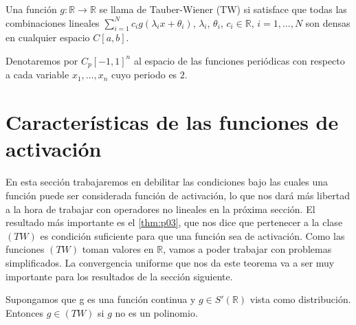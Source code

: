 \begin{definicion}
Una función $g:\mathds{R}\rightarrow \mathds{R}$ se llama de Tauber-Wiener (TW) si satisface que todas las combinaciones lineales 
$\sum_{i=1}^{N}c_{i}g(\lambda_{i}x+\theta_{i})$, $ \lambda_{i}$, $\theta_{i}$, $c_{i}\in\mathds{R}$, $i=1,\ldots,N$
son densas en cualquier espacio $C[a,b]$. 
\end{definicion}

\begin{definicion}
Denotaremos por $C_{p}[-1,1]^{n}$ al espacio de las funciones periódicas con respecto a cada variable $x_{1},\ldots,x_{n}$ cuyo periodo es $2$. 
\end{definicion}
\section{Características de las funciones de activación}

En esta sección trabajaremos en debilitar las condiciones bajo las cuales una función puede ser considerada función de activación, lo que nos dará más libertad a la hora de trabajar con operadores no lineales en la próxima sección. El resultado más importante es el \autoref{thm:p03}, que nos dice que pertenecer a la clase $(TW)$ es condición suficiente para que una función sea de activación.  Como las funciones $(TW)$ toman valores en $\mathds{R}$, vamos a poder trabajar con problemas simplificados.  La convergencia uniforme que nos da este teorema va a ser muy importante para los resultados de la sección siguiente. 
\begin{teorema}\label{thm:p01}
Supongamos que g es una función continua y $g\in S'(\mathds{R})$ vista como distribución. Entonces \(g\in(TW)\) si $g$ no es un polinomio. 
\end{teorema}


